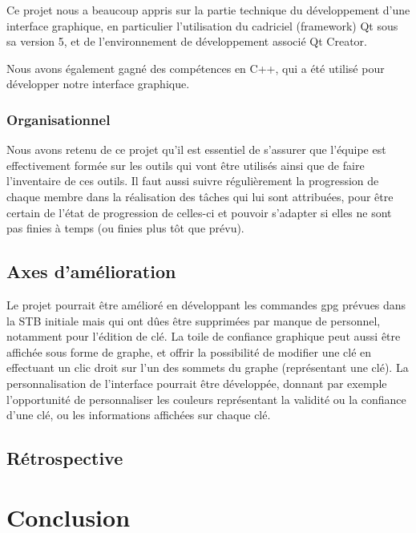 \documentclass{../res/univ-projet}
\begin{document}
      Ce projet nous a beaucoup appris sur la partie technique du développement d'une interface graphique, en particulier l'utilisation du cadriciel (framework) Qt sous sa version 5, et de l'environnement de développement associé Qt Creator.

      Nous avons également gagné des compétences en C++, qui a été utilisé pour développer notre interface graphique.




    \subsubsection{Organisationnel}

      Nous avons retenu de ce projet qu'il est essentiel de s'assurer que l'équipe est effectivement formée sur les outils qui vont être utilisés ainsi que de faire l'inventaire de ces outils.
      Il faut aussi suivre régulièrement la progression de chaque membre dans la réalisation des tâches qui lui sont attribuées, pour être certain de l'état de progression de celles-ci et pouvoir s'adapter si elles ne sont pas finies à temps (ou finies plus tôt que prévu).




  \subsection{Axes d'amélioration}
  
    Le projet pourrait être amélioré en développant les commandes gpg prévues dans la STB initiale mais qui ont dûes être supprimées par manque de personnel, notamment pour l'édition de clé. 
    La toile de confiance graphique peut aussi être affichée sous forme de graphe, et offrir la possibilité de modifier une clé en effectuant un clic droit sur l'un des sommets du graphe (représentant une clé).
    La personnalisation de l'interface pourrait être développée, donnant par exemple l'opportunité de personnaliser les couleurs représentant la validité ou la confiance d'une clé, ou les informations affichées sur chaque clé.

  \subsection{Rétrospective}



\section{Conclusion}
\end{document}
